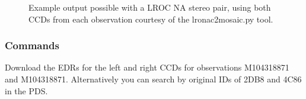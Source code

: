 \begin{figure}[h!]
\centering
  \hfil
\caption{Example output possible with a LROC NA stereo pair, using both CCDs from each observation courtesy of the lronac2mosaic.py tool.}
\label{fig:lroc-na-example}
\end{figure}

\subsubsection*{Commands}

Download the EDRs for the left and right CCDs for observations
M104318871 and M104318871. Alternatively you can search by original
IDs of 2DB8 and 4C86 in the PDS.

